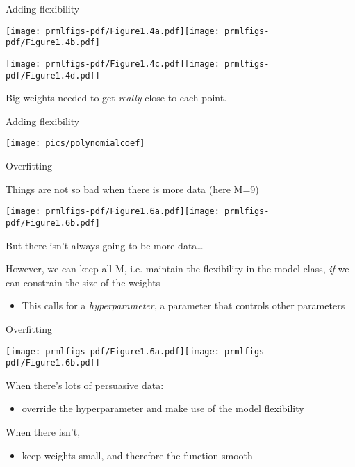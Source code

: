 \documentclass{hertieteaching}
\begin{document}
\begin{frame}{Adding flexibility}

\medskip

\centerline{\texttt{[image: prmlfigs-pdf/Figure1.4a.pdf]}\hspace{5em}\texttt{[image: prmlfigs-pdf/Figure1.4b.pdf]}}

\centerline{\texttt{[image: prmlfigs-pdf/Figure1.4c.pdf]}\hspace{5em}\texttt{[image: prmlfigs-pdf/Figure1.4d.pdf]}}

Big weights needed to get \textit{really} close to each point.

\end{frame}

\begin{frame}{Adding flexibility}

\medskip
\centerline{\texttt{[image: pics/polynomialcoef]}}

\end{frame}

\begin{frame}{Overfitting}

Things are not so bad when there is more data (here M=9)

\medskip
\centerline{\texttt{[image: prmlfigs-pdf/Figure1.6a.pdf]}\hspace{5em}\texttt{[image: prmlfigs-pdf/Figure1.6b.pdf]}}

But there isn't always going to be more data\ldots

\pause

However, we can keep all M, i.e. maintain the flexibility in the model class, \textit{if} we can constrain the size of the weights 
\begin{itemize}
  \item This calls for a \textit{hyperparameter}, a parameter that controls other parameters
\end{itemize}

\end{frame}
\begin{frame}{Overfitting}

\medskip
\centerline{\texttt{[image: prmlfigs-pdf/Figure1.6a.pdf]}\hspace{5em}\texttt{[image: prmlfigs-pdf/Figure1.6b.pdf]}}

When there's lots of persuasive data: 
\begin{itemize}
  \item override the hyperparameter and make use of the model flexibility
\end{itemize}
When there isn't,
\begin{itemize}
  \item keep weights small, and therefore the function smooth
\end{itemize}

\end{frame}
\end{document}
